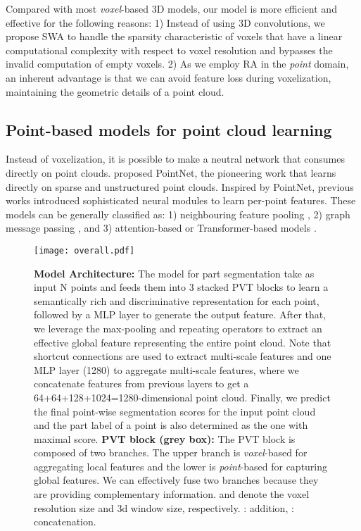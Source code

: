 \documentclass[10pt,twocolumn,letterpaper]{article}
\begin{document}
Compared with most \emph{voxel}-based 3D models, our model is more efficient and effective for the following reasons: 1) Instead of using 3D convolutions, we propose SWA to handle the sparsity characteristic of voxels that have a linear computational complexity with respect to voxel resolution and bypasses the invalid computation of empty voxels. 2) As we employ RA in the \emph{point} domain, an inherent advantage is that we can avoid feature loss during voxelization, maintaining the geometric details of a point cloud.
\subsection{Point-based models for point cloud learning}

Instead of voxelization, it is possible to make a neutral network that consumes directly on point clouds. \cite{qi2017pointnet} proposed PointNet, the pioneering work that learns directly on sparse and unstructured point clouds.
Inspired by PointNet, previous works introduced sophisticated neural modules to learn per-point features. These models can be generally classified as: 1) neighbouring feature pooling \cite{2019PointWeb,2018Recurrent}, 2) graph message passing \cite{2018Dynamic,2019Linked,2019Graph}, and 3) attention-based or Transformer-based models \cite{2021Semantic,2019PCAN,2019Learning,guo2020pct,zhao2020point,Nico}. 
\begin{figure*}
    \centering
    \texttt{[image: overall.pdf]}
    \caption{\textbf{Model Architecture: }The model for part segmentation take as input N points and feeds them into 3 stacked PVT blocks to learn a semantically rich and discriminative representation for each point, followed by a MLP layer to generate the output feature. After that, we leverage the max-pooling and repeating operators to extract an effective global feature representing the entire point cloud. Note that shortcut connections are used to extract multi-scale features and one MLP layer (1280) to aggregate multi-scale features, where we concatenate features from previous layers to get a 64+64+128+1024=1280-dimensional point cloud. Finally, we predict the final point-wise segmentation scores for the input point cloud and the part label of a point is also determined as the one with maximal score.
    \textbf{PVT block (grey box):} The PVT block is composed of two branches. The upper branch is \emph{voxel}-based for aggregating local features and the lower is \emph{point}-based for capturing global features. We can effectively fuse two branches because they are providing complementary information.  and  denote the voxel resolution size and 3d window size, respectively. : addition, : concatenation.}
    \label{PVTLayer}
\end{figure*} 
\end{document}
